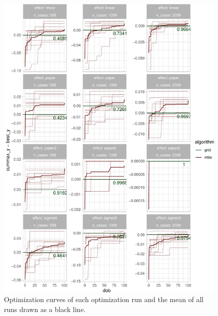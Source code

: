 \documentclass[bimj,fleqn]{w-art}
\theoremstyle{plain}
\theoremstyle{definition}
\begin{document}
\begin{figure}[htb]
\begin{center}
\includegraphics[width=\linewidth]{generated/figures/plot_opt_path.pdf}
\caption{%
  Optimization curves of each optimization run and the mean of all runs drawn as a black line.
  }
\end{center}
\end{figure}
\end{document}
